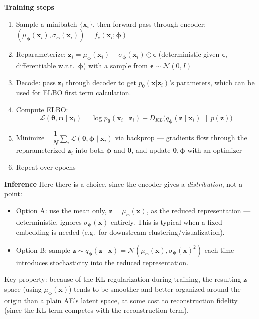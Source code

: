 \documentclass[11pt]{article}
\begin{document}
\textbf{Training steps}
\begin{enumerate}
    \item Sample a minibatch $\{\boldsymbol{x}_i\}$, then forward pass through encoder: $(\mu_{\boldsymbol{\phi}}(\boldsymbol{x}_i), \sigma_{\boldsymbol{\phi}}(\boldsymbol{x}_i)) = f_e(\boldsymbol{x}_i;\boldsymbol{\phi})$
    \item Reparameterize: $\boldsymbol{z}_i = \mu_{\boldsymbol{\phi}}(\boldsymbol{x}_i) + \sigma_{\boldsymbol{\phi}}(\boldsymbol{x}_i)\odot \boldsymbol{\epsilon}$ (deterministic given $\boldsymbol{\epsilon}$, differentiable w.r.t.\ $\boldsymbol{\phi}$) with a sample from $\boldsymbol{\epsilon} \sim \mathcal{N}(0,I)$
    \item Decode: pass $\boldsymbol{z}_i$ through decoder to get $p_{\boldsymbol{\theta}}(\boldsymbol{x}|\boldsymbol{z}_i)$'s parameters, which can be used for ELBO first term calculation.
    \item Compute ELBO:
    \[
        \mathcal{L}(\boldsymbol{\theta},\boldsymbol{\phi} \mid \boldsymbol{x}_i) = \log p_{\boldsymbol{\theta}}(\boldsymbol{x}_i \mid \boldsymbol{z}_i) - D_{KL}\big(q_{\boldsymbol{\phi}}(\boldsymbol{z} \mid \boldsymbol{x}_i)\,\|\,p(\boldsymbol{z})\big)
    \]
    \item Minimize $-\dfrac{1}{N}\sum_{i} \mathcal{L}(\boldsymbol{\theta},\boldsymbol{\phi} \mid \boldsymbol{x}_i)$ via backprop --- gradients flow through the reparameterized $\boldsymbol{z}_i$ into both $\boldsymbol{\phi}$ and $\boldsymbol{\theta}$, and update $\boldsymbol{\theta}, \boldsymbol{\phi}$ with an optimizer
    \item Repeat over epochs
\end{enumerate}

\textbf{Inference}
Here there is a choice, since the encoder gives a \emph{distribution}, not a point:
\begin{itemize}
    \item Option A: use the mean only, $\boldsymbol{z} = \mu_{\boldsymbol{\phi}}(\boldsymbol{x})$, as the reduced representation --- deterministic, ignores $\sigma_{\boldsymbol{\phi}}(\boldsymbol{x})$ entirely. This is typical when a fixed embedding is needed (e.g.\ for downstream clustering/visualization).
    \item Option B: sample $\boldsymbol{z} \sim q_{\boldsymbol{\phi}}(\boldsymbol{z}\mid \boldsymbol{x}) = \mathcal{N}(\mu_{\boldsymbol{\phi}}(\boldsymbol{x}), \sigma_{\boldsymbol{\phi}}(\boldsymbol{x})^2)$ each time --- introduces stochasticity into the reduced representation.
\end{itemize}
Key property: because of the KL regularization during training, the resulting $\boldsymbol{z}$-space (using $\mu_{\boldsymbol{\phi}}(\boldsymbol{x})$) tends to be smoother and better organized around the origin than a plain AE's latent space, at some cost to reconstruction fidelity (since the KL term competes with the reconstruction term).
\end{document}
